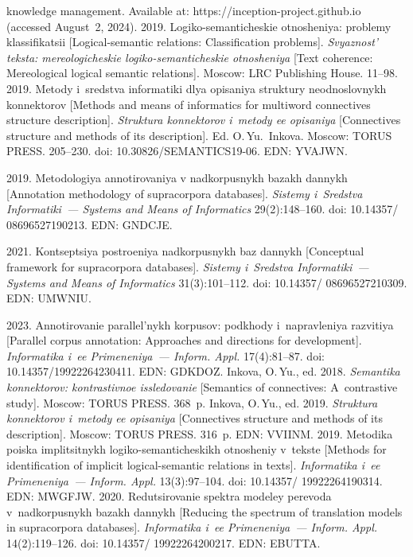 \begin{multicols}{2}
{{\begin{thebibliography}{99}
knowledge management. Available at: {\sf https://inception-project.github.io} (accessed August~2, 2024).
 2019. Logiko-semanticheskie otnosheniya: problemy klassifikatsii 
[Logical-semantic relations: Classification problems]. \textit{Svyaznost' teksta: mereologicheskie 
logiko-semanticheskie otnosheniya} [Text coherence: Mereological logical semantic relations]. 
Moscow: LRC Publishing House. 11--98.
 2019. Metody i~sredstva informatiki dlya 
opisaniya struktury neodnoslovnykh konnektorov [Methods and means of informatics for 
multiword connectives structure description]. \textit{Struktura konnektorov i~metody ee opisaniya} 
[Connectives structure and methods of its description]. Ed. O.\,Yu.~Inkova. Moscow: TORUS 
PRESS. 205--230. doi: 10.30826/SEMANTICS19-06. EDN: YVAJWN.

 2019. Metodologiya annotirovaniya 
v nadkorpusnykh bazakh dannykh [Annotation methodology of supracorpora databases]. \textit{Sistemy 
i~Sredstva Informatiki~--- Systems and Means of Informatics} 29(2):148--160. doi: 10.14357/ 08696527190213. EDN: GNDCJE.

 2021. Kontseptsiya postroeniya nadkorpusnykh baz dannykh [Conceptual 
framework for supracorpora databases]. \textit{Sistemy i~Sredstva Informatiki~--- Systems and Means of 
Informatics} 31(3):101--112. doi: 10.14357/ 08696527210309. EDN: UMWNIU.

 2023. Annotirovanie parallel'nykh kor\-pu\-sov: podkhody i~napravleniya razvitiya 
[Parallel corpus annotation: Approaches and directions for development]. 
\textit{Informatika i~ee Primeneniya~--- Inform. Appl.} 17(4):81--87. doi: 10.14357/19922264230411. 
EDN: GDKDOZ.
Inkova, O.\,Yu., ed. 2018. \textit{Semantika konnektorov: kontrastivnoe issledovanie} [Semantics 
of connectives: A~contrastive study]. Moscow: TORUS PRESS. 368~p.
Inkova, O.\,Yu., ed. 2019. \textit{Struktura konnektorov i~metody ee opisaniya} [Connectives 
structure and methods of its description]. Moscow: TORUS PRESS.  316~p. EDN: VVIINM.
 2019. Metodika poiska implitsitnykh 
logiko-semanticheskikh otnosheniy v~tekste [Methods for identification of implicit logical-semantic 
relations in texts]. \textit{Informatika i~ee Primeneniya~--- Inform. Appl.} 13(3):97--104. doi: 
10.14357/ 19922264190314. EDN: MWGFJW.
 2020. Re\-du\-tsi\-ro\-va\-nie spektra modeley perevoda 
v~nad\-kor\-pus\-nykh ba\-zakh dan\-nykh [Reducing the spectrum of translation models in supracorpora 
databases]. \textit{Informatika i~ee Primeneniya~--- Inform. Appl.} 14(2):119--126. doi:  10.14357/ 19922264200217. EDN: EBUTTA.


\end{thebibliography}}}
\end{multicols}
